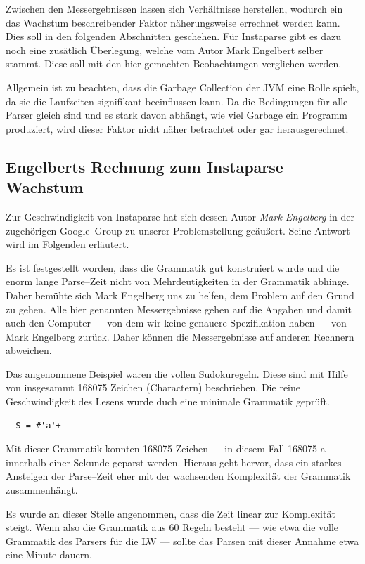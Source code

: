 \documentclass[ngerman,a4paper,abstracton,open=right,twoside=false,toc=listofnumbered,bibtotocnumbered]{scrreprt}
\begin{document}
Zwischen den Messergebnissen lassen sich Verhältnisse herstellen, wodurch ein das Wachstum beschreibender Faktor näherungsweise errechnet werden kann. Dies soll in den folgenden Abschnitten geschehen. Für Instaparse gibt es dazu noch eine zusätlich Überlegung, welche vom Autor Mark Engelbert selber stammt. Diese soll mit den hier gemachten Beobachtungen verglichen werden.

Allgemein ist zu beachten, dass die Garbage Collection der JVM eine Rolle spielt, da sie die Laufzeiten signifikant beeinflussen kann. Da die Bedingungen für alle Parser gleich sind und es stark davon abhängt, wie viel \glqq{}Garbage\grqq{} ein Programm produziert, wird dieser Faktor nicht näher betrachtet oder gar herausgerechnet.

\subsection{Engelberts Rechnung zum Instaparse--Wachstum}\label{Engelberg}

Zur Geschwindigkeit von Instaparse hat sich dessen Autor \emph{Mark Engelberg} in der zugehörigen Google--Group zu unserer Problemstellung geäußert. Seine Antwort wird im Folgenden erläutert. \cite{instaparse-google-group}

Es ist festgestellt worden, dass die Grammatik gut konstruiert wurde und die enorm lange Parse--Zeit nicht von Mehrdeutigkeiten in der Grammatik abhinge. Daher bemühte sich Mark Engelberg uns zu helfen, dem Problem auf den Grund zu gehen. Alle hier genannten Messergebnisse gehen auf die Angaben und damit auch den Computer --- von dem wir keine genauere Spezifikation haben --- von Mark Engelberg zurück. Daher können die Messergebnisse auf anderen Rechnern abweichen.

Das angenommene Beispiel waren die vollen Sudokuregeln. Diese sind mit Hilfe von insgesammt 168075 Zeichen (Charactern) beschrieben. Die reine Geschwindigkeit des Lesens wurde duch eine minimale Grammatik geprüft.

\begin{lstlisting}
  S = #'a'+
\end{lstlisting}

Mit dieser Grammatik konnten 168075 Zeichen --- in diesem Fall 168075 \glqq{}a\grqq{} --- innerhalb einer Sekunde geparst werden. Hieraus geht hervor, dass ein starkes Ansteigen der Parse--Zeit eher mit der wachsenden Komplexität der Grammatik zusammenhängt.

Es wurde an dieser Stelle angenommen, dass die Zeit linear zur Komplexität steigt. Wenn also die Grammatik aus 60 Regeln besteht --- wie etwa die volle Grammatik des Parsers für die LW --- sollte das Parsen mit dieser Annahme etwa eine Minute dauern.
\end{document}
